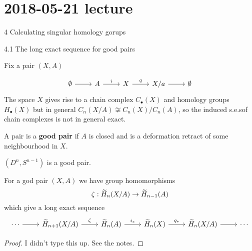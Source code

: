 \section{2018-05-21 lecture}

4 Calculating singular homology gorups

4.1 The long exact sequence for good pairs

Fix a pair $(X,A)$

\begin{equation*}
  \begin{tikzcd}
    \emptyset \ar[r] & A \ar[r, "i"] & X \ar[r, "q"] & X/a \ar[r] & \emptyset
  \end{tikzcd}
\end{equation*}
The space $X$ gives rise to a chain complex $C_\bullet(X)$ and homology groups $H_\bullet(X)$ but in general $C_n(X/A) \not\cong C_n(X)/C_n(A)$, so the induced s.e.s\@ of chain complexes is not in general exact.

\begin{defn}
  A pair is a \textbf{good pair} if $A$ is closed and is a deformation retract of some neighbourhood in $X$.
\end{defn}

\begin{exam}
  $(D^n,S^{n-1})$ is a good pair.
\end{exam}

\begin{thm}
  For a god pair $(X,A)$ we have group homomorphisms
  \[ \zeta: \widetilde H_n(X/A) \to \widetilde H_{n-1}(A) \]
  which give a long exact sequence
  \begin{equation*}
    \begin{tikzcd}
      \cdots\ar[r] & \wt H_{n+1}(X/A) \ar[r, "\zeta"] & \wt H_n(A) \ar[r, "i_*"] & \wt H_n(X) \ar[r, "q_*"] & \wt H_n(X/A) \ar[r] & \cdots
    \end{tikzcd}
  \end{equation*}
\end{thm}

\begin{proof}
  I didn't type this up.
  See the notes.
\end{proof}

